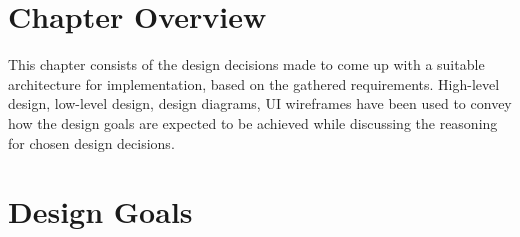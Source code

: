 \section{Chapter Overview}
This chapter consists of the design decisions made to come up with a suitable architecture for implementation, based on the gathered requirements. High-level design, low-level design, design diagrams, UI wireframes have been used to convey how the design goals are expected to be achieved while discussing the reasoning for chosen design decisions.

\section{Design Goals}

\vspace{-4mm}       %


